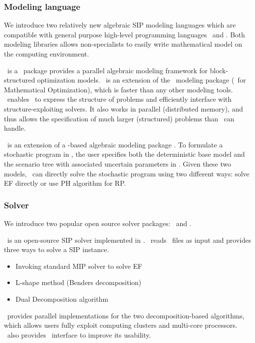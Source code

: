 \subsubsection{Modeling language}
We introduce two relatively new algebraic SIP modeling languages which are compatible with general purpose high-level programming languages \julia\ and \python. Both modeling libraries allows non-specialists to easily write mathematical model on the computing environment.

\structjump\ is a \julia\ package provides a parallel algebraic modeling framework for block-structured optimization models. \structjump\ is an extension of the \jump\ modeling package (\julia\ for Mathematical Optimization), which is faster than any other modeling tools. \structjump\ enables \jump\ to express the structure of problems and efficiently interface with structure-exploiting solvers. It also works in parallel (distributed memory), and thus allows the specification of much larger (structured) problems than \jump\ can handle. 

\pysp\ is an extension of a \python-based algebraic modeling package \pyomo. To formulate a
stochastic program in \pysp, the user specifies both the deterministic base model and
the scenario tree with associated uncertain parameters in \pyomo. Given these two models, \pysp\ can directly solve the stochastic program using two different ways: solve EF directly or use PH algorithm for RP. %

\subsubsection{Solver}
We introduce two popular open source solver packages: \dsp\ and \pysp. 
 
\dsp\ is an open-source SIP solver implemented in \cpp. \dsp\ reads \smps\ files as input and provides three ways to solve a SIP instance.
\begin{itemize}
	\item Invoking standard MIP solver to solve EF
	\item L-shape method (Benders decomposition)
	\item Dual Decomposition algorithm
\end{itemize}
\dsp\ provides parallel implementations for the two decomposition-based algorithms, which allows users fully exploit computing clusters and multi-core processors. \dsp\ also provides \julia\ interface to improve its usability.

